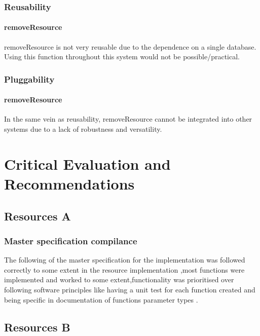 \documentclass[a4paper]{article}
\begin{document}
\subsubsection {Reusability}

\paragraph{removeResource}
removeResource is not very reusable due to the dependence on a single database. Using this function throughout this system would not be possible/practical.

\subsubsection {Pluggability}

\paragraph{removeResource}
In the same vein as reusability, removeResource cannot be integrated into other systems due to a lack of robustness and versatility.


\section {Critical Evaluation and Recommendations}
\subsection {Resources A}
\subsubsection {Master specification compilance}
The following of the master specification for the implementation was followed correctly to some extent in the resource implementation ,most functions were implemented and worked to some extent,functionality was prioritised over following software principles like having a unit test for each function created and being specific in documentation of functions parameter types .

\subsection {Resources B}
\end{document}
